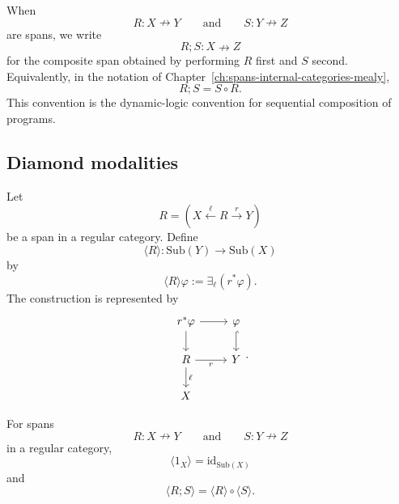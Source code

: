 When
\[
R:X\nrightarrow Y
\qquad\text{and}\qquad
S:Y\nrightarrow Z
\]
are spans, we write
\[
R;S:X\nrightarrow Z
\]
for the composite span obtained by performing \(R\) first and \(S\) second.
Equivalently, in the notation of
Chapter~\ref{ch:spans-internal-categories-mealy},
\[
R;S=S\circ R.
\]
This convention is the dynamic-logic convention for sequential composition of
programs.

\subsection{Diamond modalities}
\label{subsec:relative-diamond-modalities}

\begin{definition}
\label{def:relative-span-diamond}
Let
\[
R=
\left(
X\xleftarrow{\ell}R\xrightarrow{r}Y
\right)
\]
be a span in a regular category. Define
\[
\langle R\rangle:\mathrm{Sub}(Y)\to\mathrm{Sub}(X)
\]
by
\[
\langle R\rangle\varphi
:=
\exists_\ell(r^\ast\varphi).
\]
The construction is represented by
\[
\begin{tikzcd}
r^\ast\varphi
\arrow[r]
\arrow[d]
&
\varphi
\arrow[d,hook]
\\
R
\arrow[r,"r"']
\arrow[d,"\ell"]
&
Y
\\
X
\end{tikzcd}
.
\]
\end{definition}

\begin{proposition}
\label{prop:relative-diamond-functoriality}
For spans
\[
R:X\nrightarrow Y
\qquad\text{and}\qquad
S:Y\nrightarrow Z
\]
in a regular category,
\[
\langle 1_X\rangle=\mathrm{id}_{\mathrm{Sub}(X)}
\]
and
\[
\langle R;S\rangle
=
\langle R\rangle\circ\langle S\rangle.
\]
\end{proposition}

